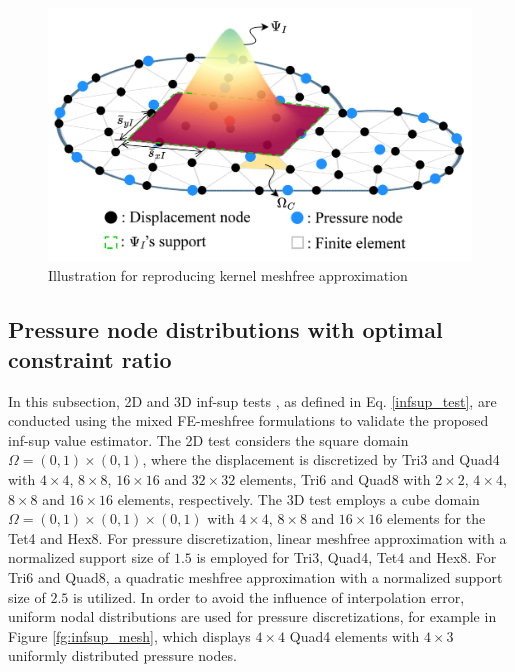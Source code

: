 \begin{figure}[H]
\centering
\includegraphics[width=\textwidth]{mix.png}
\caption{Illustration for reproducing kernel meshfree approximation}\label{fg:rk_approximation}
\end{figure}

\subsection{Pressure node distributions with optimal constraint ratio}\label{subsec:optimal_constraint_ratio}

In this subsection, 2D and 3D inf-sup tests \cite{chapelle1993}, as defined in Eq. \ref{infsup_test}, are conducted using the mixed FE-meshfree formulations to validate the proposed inf-sup value estimator.
The 2D test considers the square domain $\Omega = (0,1)\times (0,1)$, where the displacement is discretized by Tri3 and Quad4 with $4\times 4$, $8\times 8$, $16\times 16$ and $32\times 32$ elements, Tri6 and Quad8 with $2\times 2$, $4\times 4$, $8\times 8$ and $16\times 16$ elements, respectively. The 3D test employs a cube domain $\Omega = (0,1)\times (0,1)\times (0,1)$ with $4\times 4$, $8\times 8$ and $16\times 16$ elements for the Tet4 and Hex8.
For pressure discretization, linear meshfree approximation with a normalized support size of $1.5$ is employed for Tri3, Quad4, Tet4 and Hex8.
For Tri6 and Quad8, a quadratic meshfree approximation with a normalized support size of $2.5$ is utilized.
In order to avoid the influence of interpolation error, uniform nodal distributions are used for pressure discretizations, for example in Figure \ref{fg:infsup_mesh}, which displays $4\times4$ Quad4 elements with $4\times3$ uniformly distributed pressure nodes.

